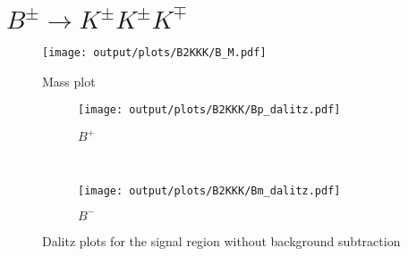\documentclass[12pt,a4paper]{article}
\begin{document}
\renewcommand{\thefootnote}{\fnsymbol{footnote}}
\setcounter{footnote}{1}

%
%
%


\renewcommand{\thefootnote}{\arabic{footnote}}
\setcounter{footnote}{0}




\pagestyle{plain} %
\setcounter{page}{1}

\linenumbers

%

% 

\clearpage
\section{$B^\pm \rightarrow K^\pm K^\pm K^\mp$}
\FloatBarrier

\begin{figure}[ht]
  \centering
  \texttt{[image: output/plots/B2KKK/B\_M.pdf]}
  \caption{Mass plot}
\end{figure}

\begin{figure}[ht]
  \centering
  \begin{subfigure}[t]{0.5\textwidth}
    \centering
    \texttt{[image: output/plots/B2KKK/Bp\_dalitz.pdf]}
    \caption{$B^+$}
  \end{subfigure}%
  ~
  \begin{subfigure}[t]{0.5\textwidth}
    \centering
    \texttt{[image: output/plots/B2KKK/Bm\_dalitz.pdf]}
    \caption{$B^-$}
  \end{subfigure}%
  \caption{Dalitz plots for the signal region without background subtraction}
\end{figure}
\end{document}
